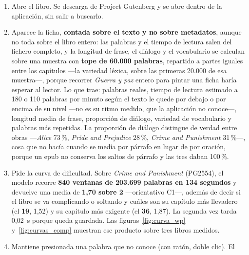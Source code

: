 \documentclass[11pt,a4paper]{article}
\newcommand{\pct}{\,\%}
\begin{document}
\begin{enumerate}[leftmargin=*, itemsep=4pt]
        \textbf{Y aquí conviene decir algo que el propio recorrido enseña.} Lo que
        devuelve la búsqueda \textbf{no está filtrado por el nivel del lector}: ordena
        por cercanía al tema, y la dificultad va al lado de cada resultado para que el
        lector decida. En este recorrido eso importa, porque el libro que abre mide 1,70
        y ella está en 1,20: le queda por encima, y el valor de la herramienta es
        precisamente que \textbf{lo sabe antes de la primera página}.
  \item Abre el libro. Se descarga de Project Gutenberg y se abre dentro de la
        aplicación, sin salir a buscarlo.
  \item Aparece la ficha, \textbf{contada sobre el texto y no sobre metadatos},
        aunque no toda sobre el libro entero: las palabras y el tiempo de lectura
        salen del fichero completo, y la longitud de frase, el diálogo y el
        vocabulario se calculan sobre una muestra con \textbf{tope de 60.000 palabras},
        repartido a partes iguales entre los capítulos —la variedad léxica, sobre las
        primeras 20.000 de esa muestra—, porque recorrer \emph{Guerra y
        paz} entero para pintar una ficha haría esperar al lector. Lo que trae:
        palabras reales, tiempo de lectura estimado a 180 o 110 palabras por minuto según
        el texto le quede por debajo o por encima de su nivel —no es su ritmo medido, que
        la aplicación no conoce—, longitud media de frase,
        proporción de diálogo, variedad de vocabulario y palabras más repetidas. La
        proporción de diálogo distingue de verdad entre obras —\emph{Alice} 73\pct,
        \emph{Pride and Prejudice} 28\pct, \emph{Crime and Punishment} 31\pct—, cosa que
        no hacía cuando se medía por párrafo en lugar de por oración, porque un epub no
        conserva los saltos de párrafo y las tres daban 100\pct.
  \item Pide la curva de dificultad. Sobre \emph{Crime and Punishment} (PG2554), el modelo
        recorre \textbf{840 ventanas de 203.699 palabras en 134 segundos} y devuelve una
        media de \textbf{1,70 sobre 2} —orientativo C1—, además de decir si el libro se va
        complicando o soltando y cuáles son su capítulo más llevadero (el \textbf{19},
        1,52) y su capítulo más exigente (el \textbf{36}, 1,87). La segunda vez
        tarda 0,02~s porque queda guardada. Las figuras~\ref{fig:curva_wp}
        y~\ref{fig:curvas_comp} muestran ese producto sobre tres libros medidos.
  \item Mantiene presionada una palabra que no conoce (con ratón, doble clic). El

\end{enumerate}
\end{document}
